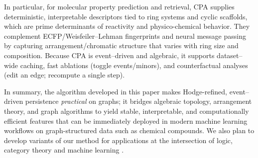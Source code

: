 \documentclass[runningheads]{llncs}
\begin{document}
In particular, for molecular property prediction and retrieval, CPA supplies deterministic, interpretable descriptors tied to ring systems and cyclic scaffolds, which are prime determinants of reactivity and physico-chemical behavior. They complement ECFP/Weisfeiler–Lehman fingerprints and neural message passing by capturing arrangement/chromatic structure that varies with ring size and composition. Because CPA is event–driven and algebraic, it supports dataset–wide caching, fast ablations (toggle events/minors), and counterfactual analyses (edit an edge; recompute a single step).

In summary, the algorithm developed in this paper makes Hodge-refined, event–driven persistence \emph{practical} on graphs; it bridges algebraic topology, arrangement theory, and graph algorithms to yield stable, interpretable, and computationally efficient features that can be immediately deployed in modern machine learning workflows on graph-structured data such as chemical compounds. We also plan to develop variants of our method for applications at the intersection of logic, category theory and machine learning \cite{Mar09,Mar10,Mar12,Mar13a,Mar13b,Mar20a,Mar20b}.














\end{document}
